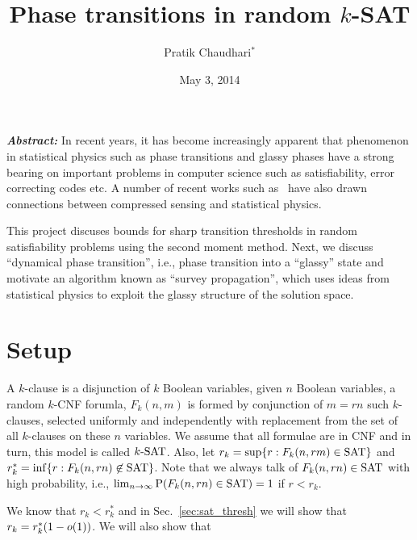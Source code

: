 \documentclass[letterpaper, 10pt, twocolumn, reqno]{amsart}
\title{Phase transitions in random $k$-SAT}
\author{Pratik Chaudhari$^*$}
\date{May 3, 2014}
\begin{document}
\maketitle
{\small
\textbf{\emph{Abstract:}}
In recent years, it has become increasingly apparent that phenomenon in statistical physics such as phase transitions and glassy phases have a strong bearing on important problems in computer science such as satisfiability, error correcting codes etc. A number of recent works such as~\cite{krzakala2012statistical} have also drawn connections between compressed sensing and statistical physics.

This project discuses bounds for sharp transition thresholds in random satisfiability problems using the second moment method. Next, we discuss ``dynamical phase transition'', i.e., phase transition into a ``glassy'' state and motivate an algorithm known as ``survey propagation'', which uses ideas from statistical physics to exploit the glassy structure of the solution space.
}



\section{Setup}
\label{sec:setup}
A $k$-clause is a disjunction of $k$ Boolean variables, given $n$ Boolean
variables, a random $k$-CNF forumla, $F_k(n, m)$ is formed by conjunction of $m = rn$ such $k$-clauses, selected uniformly and independently with
replacement from the set of all $k$-clauses on these $n$ variables. We assume that all formulae are in CNF and in turn, this model is called $k\textrm{-SAT}$. Also,
let $r_k = \sup \{ r: F_k(n, rm) \in \textrm{SAT} \}$ and $r_k^* = \inf \{ r: F_k(n, rn) \not\in \textrm{SAT} \}$. Note that we always talk of $F_k(n,rn) \in \textrm{SAT}$ with high probability, i.e., $\lim_{n\to \infty} \textrm{P}(F_k(n,rn) \in \textrm{SAT}) = 1$ if $r < r_k$.

We know that $r_k < r_k^*$ and in Sec.~\ref{sec:sat_thresh}
we will show that $r_k = r_k^*(1-o(1))$. We will also show that
\end{document}
